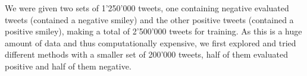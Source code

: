 We were given two sets of 1'250'000 tweets, one containing negative evaluated tweets (contained a negative smiley) and the other positive tweets (contained a positive smiley), making a total of 2'500'000 tweets for training. As this is a huge amount of data and thus computationally expensive, we first explored and tried different methods with a smaller set of 200'000 tweets, half of them evaluated positive and half of them negative.